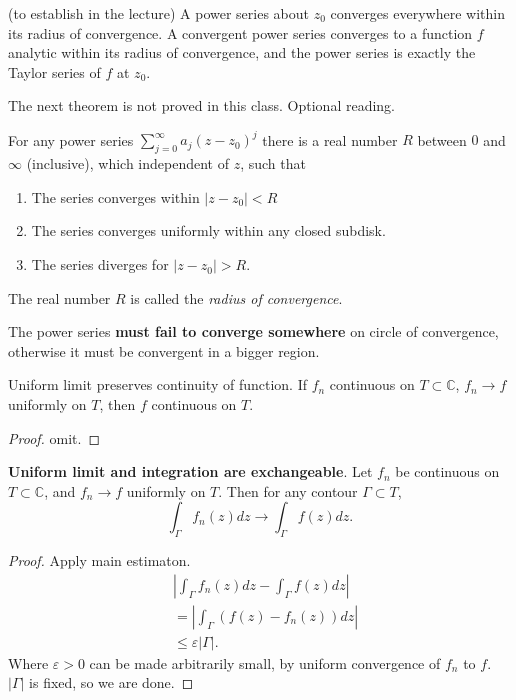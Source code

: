 \begin{fact}
	(to establish in the lecture)
	A power series about $z_0$ converges everywhere within its radius of convergence. A convergent power series converges to a function $f$ analytic within its radius of convergence, and the power series is exactly the Taylor series of $f$ at $z_0$.

\end{fact}

The next theorem is not proved in this class. Optional reading.
\begin{theorem}
	For any power series $\sum_{j=0}^{\infty } a_j(z - z_0)^j$ there is a real number $R$ between $0$ and $\infty $ (inclusive), which independent of $z$, such that
	\begin{enumerate}
		\item The series converges within $|z - z_0| < R$
		\item The series converges uniformly within any closed subdisk.
		\item The series diverges for $|z - z_0| > R$.
	\end{enumerate}
	The real number $R$ is called the  \textit{radius of convergence}.
\end{theorem}
\begin{remark}
	The power series \textbf{must fail to converge somewhere} on circle of convergence, otherwise it must be convergent in a bigger region.
\end{remark}

\begin{theorem}
	Uniform limit preserves continuity of function. If $f_n$ continuous on $T \subset \mathbb{C}$, $f_n \to f$ uniformly on $T$, then $f$ continuous on $T$.
\end{theorem}
\begin{proof}
	omit.
\end{proof}

\begin{theorem}
	\textbf{Uniform limit and integration are exchangeable}. Let $f_n$ be continuous on $T \subset \mathbb{C}$, and  $f_n \to f$ uniformly on $T$. Then for any contour $\Gamma \subset T$, 
	\[
		\int _\Gamma f_n(z) dz \to \int _\Gamma f(z) dz
	.\] 
\end{theorem}
\begin{proof}
	Apply main estimaton.
	\begin{align*}
		&\left|\int _\Gamma f_n(z) dz - \int _\Gamma f(z) dz\right|\\
		&= \left| \int _\Gamma (f(z) - f_n(z)) dz\right|   \\
		&\le \varepsilon |\Gamma|
	.\end{align*}
	Where $\varepsilon > 0$ can be made arbitrarily small, by uniform convergence of $f_n$ to $f$. $|\Gamma|$ is fixed, so we are done.
\end{proof}



